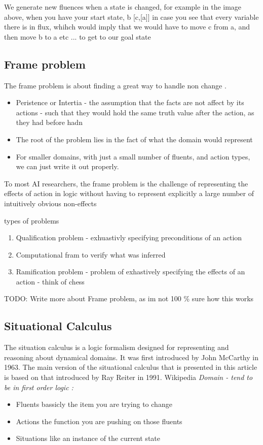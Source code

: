 \documentclass{article}
\theoremstyle{mytheoremstyle}
\theoremstyle{mytheoremstyle}
\theoremstyle{myproblemstyle}
\begin{document}
We generate new fluences when a state is changed, for example in the image above, when you have your start state, b [c,[a]] in case you see that every variable there is in flux, whihch would imply that we would have to move c from a, and then move b to a etc ... to get to our goal state

\subsection{Frame problem}
The frame problem is about finding a great way to handle non change .
\begin{itemize}
	\item Peristence or Intertia - the assumption that the facts are not affect by its actions - such that they would hold the same truth value after the action, as they had before hadn

	\item The root of the problem lies in the fact of what the domain would represent

	\item  For smaller domains, with just a small number of fluents, and action types, we can just write it out properly.
\end{itemize}
To most AI researchers, the frame problem is the challenge of representing the effects of action in logic without having to represent explicitly a large number of intuitively obvious non-effects

types of problems
\begin{enumerate}
	\item Qualification problem - exhuastivly specifying preconditions of an action
	\item Computational fram to verify what was inferred

	\item Ramification problem - problem of exhastively specifying the effects of an action - think of chess


\end{enumerate}
TODO: Write more about Frame problem, as im not 100 \% sure how this works

\subsection{Situational Calculus}
The situation calculus is a logic formalism designed for representing and reasoning about dynamical domains. It was first introduced by John McCarthy in 1963. The main version of the situational calculus that is presented in this article is based on that introduced by Ray Reiter in 1991. Wikipedia
\textit{Domain - tend to be in first order logic :}\\
\begin{itemize}
	\item Fluents bassicly the item you are trying to change
	\item Actions the function you are pushing on those fluents
	\item Situations like an instance of the current state
\end{itemize}
\end{document}
